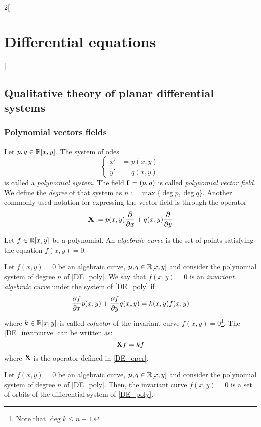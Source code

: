 \documentclass[../../../main_math.tex]{subfiles}
\begin{document}
\begin{multicols}{2}[\section{Differential equations}]
  \subsection{Qualitative theory of planar differential systems}
  \subsubsection{Polynomial vectors fields}
  \begin{definition}
    Let $p,q\in\mathbb{R}[x,y]$. The system of odes
    \begin{equation}\label{DE_poly}
      \left\{
      \begin{aligned}
        x' & =p(x,y) \\
        y' & =q(x,y)
      \end{aligned}
      \right.
    \end{equation}
    is called a \emph{polynomial system}. The field $\boldsymbol{\mathrm{f}}=(p,q)$ is called \emph{polynomial vector field}. We define the \emph{degree} of that system as $n:=\max\{\deg p,\deg q\}$. Another commonly used notation for expressing the vector field is through the operator
    \begin{equation}\label{DE_oper}
      \boldsymbol{\mathrm{X}}:=p(x,y)\pdv{}{x}+q(x,y)\pdv{}{y}
    \end{equation}
  \end{definition}
  \begin{definition}
    Let $f\in\mathbb{R}[x,y]$ be a polynomial. An \emph{algebraic curve} is the set of points satisfying the equation $f(x,y)=0$.
  \end{definition}
  \begin{definition}
    Let $f(x,y)=0$ be an algebraic curve, $p,q\in\mathbb{R}[x,y]$ and consider the polynomial system of degree $n$ of \cref{DE_poly}. We say that $f(x,y)=0$ is an \emph{invariant algebraic curve} under the system of \cref{DE_poly} if
    \begin{equation}\label{DE_invarcurve}
      \pdv{f}{x}(x,y)p(x,y)+\pdv{f}{y}q(x,y)=k(x,y)f(x,y)
    \end{equation}
    where $k\in\mathbb{R}[x,y]$ is called \emph{cofactor} of the invariant curve $f(x,y)=0$\footnote{Note that $\deg k\leq n-1$.}. The \cref{DE_invarcurve} can be written as: $$\boldsymbol{\mathrm{X}}f=kf$$
    where $\boldsymbol{\mathrm{X}}$ is the operator defined in \cref{DE_oper}.
  \end{definition}
  \begin{proposition}
    Let $f(x,y)=0$ be an algebraic curve, $p,q\in\mathbb{R}[x,y]$ and consider the polynomial system of degree $n$ of \cref{DE_poly}. Then, the invariant curve $f(x,y)=0$ is a set of orbits of the differential system of \cref{DE_poly}.
  \end{proposition}

\end{multicols}
\end{document}
